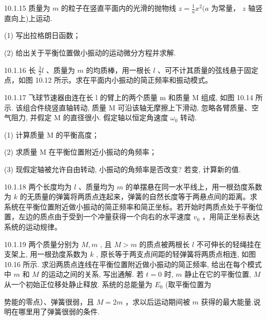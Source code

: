 \begin{problem}{10.1.15}
质量为 $m$ 的粒子在竖直平面内的光滑的抛物线 $z = \frac{1}{a} x^2 (a$ 为常量， $z$ 轴竖直向上)上运动.

(1) 写出拉格朗日函数；

(2) 给出关于平衡位置做小振动的运动微分方程并求解.
\end{problem}
\clearpage


\begin{problem}{10.1.16}
长 $\frac{3}{2} l$ 、质量为 $m$ 的均质棒，用一根长 $l$ 、可不计其质量的弦线悬于固定点，如图 10.12 所示。求在平面内小振动的简正频率和振动模式。
\begin{center}

\end{center}
\end{problem}
\clearpage


\begin{problem}{10.1.17}
飞球节速器由连在长 l 的臂上的两个质量 m 和质量 M 组成, 如图 10.14 所示. 该组合件绕竖直轴转动, 质量 M 可沿该轴无摩擦上下滑动, 忽略各臂质量、空气阻力, 并假定 M 的直径很小. 假定轴以恒定角速度 $\omega_{0}$ 转动.

(1) 计算质量 M 的平衡高度；

(2) 求质量 M 在平衡位置附近小振动的角频率；

(3) 现假定轴被允许自由转动, 小振动的角频率是否改变? 若变, 计算新的值.
\begin{center}

\end{center}
\end{problem}
\clearpage


\begin{problem}{10.1.18}
两个长度均为 $l$ 、质量均为 $m$ 的单摆悬在同一水平线上，用一根劲度系数为 $k$ 的无质量的弹簧将两质点连起来，弹簧的自然长度等于两悬点间的距离。求系统在平衡位置附近做小振动的简正频率和简正坐标。若开始时两质点处于平衡位置，左边的质点由于受到一个冲量获得一个向右的水平速度 $v_0$ ，用简正坐标表达系统的运动规律。
\begin{center}

\end{center}
\end{problem}
\clearpage


\begin{problem}{10.1.19}
两个质量分别为 $M, m$ , 且 $M > m$ 的质点被两根长 $l$ 不可伸长的轻绳挂在支架上, 用一根劲度系数为 $k$ , 原长等于两支点间距的轻弹簧将两质点相连, 如图 10.16 所示. 求沿两质点连线在平衡位置附近做小振动的简正频率, 给出在每个模式中 $m$ 和 $M$ 的运动之间的关系, 写出通解. 若 $t = 0$ 时, $m$ 静止在它的平衡位置, $M$ 从一个初始正位移处静止释放. 系统的总能量为 $E_0$ (取平衡位置为

势能的零点）、弹簧很弱，且 $M = 2m$ ，求以后运动期间被 $m$ 获得的最大能量.说明在哪里用了弹簧很弱的条件.
\begin{center}

\end{center}
\end{problem}
\clearpage


